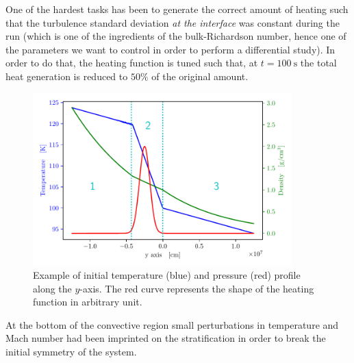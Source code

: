 One of the hardest tasks has been to generate the correct amount of heating such that the turbulence standard deviation \textit{at the interface} was constant during the run (which is one of the ingredients of the bulk-Richardson number, hence one of the parameters we want to control in order to perform a differential study). In order to do that, the heating function is tuned such that, at $t=100 \ \mathrm{s}$ the total heat generation is reduced to $50 \%$ of the original amount.

\begin{figure}[t]
\centering
\includegraphics[width=10cm]{./img/twin.pdf}
\caption{Example of initial temperature (blue) and pressure (red) profile along the $y$-axis. The red curve represents the shape of the heating function in arbitrary unit.}
\label{fig:twin}
\centering
\end{figure}
At the bottom of the convective region small perturbations in temperature and Mach number had been imprinted on the stratification in order to break the initial symmetry of the system.

